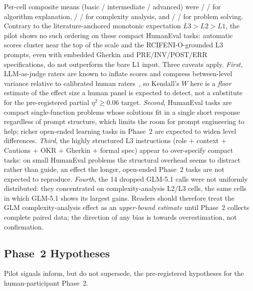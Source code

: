 \documentclass[runningheads]{llncs}
\begin{document}
Per-cell composite means (basic / intermediate / advanced) were \PilotAlgoBasic{} / \PilotAlgoInt{} / \PilotAlgoAdv{} for algorithm explanation, \PilotCxBasic{} / \PilotCxInt{} / \PilotCxAdv{} for complexity analysis, and \PilotPsBasic{} / \PilotPsInt{} / \PilotPsAdv{} for problem solving. Contrary to the literature-anchored monotonic expectation $L3>L2>L1$, the pilot shows no such ordering on these compact HumanEval tasks: automatic scores cluster near the top of the scale and the RCIFENI-O-grounded L3 prompts, even with embedded Gherkin and PRE/INV/POST/ERR specifications, do not outperform the bare L1 input. Three caveats apply. \emph{First}, LLM-as-judge raters are known to inflate scores and compress between-level variance relative to calibrated human raters~\cite{Liu2023}, so Kendall's $W$ here is a \emph{floor} estimate of the effect size a human panel is expected to detect, not a substitute for the pre-registered partial $\eta^2\geq0.06$ target. \emph{Second}, HumanEval tasks are compact single-function problems whose solutions fit in a single short response regardless of prompt structure, which limits the room for prompt engineering to help; richer open-ended learning tasks in Phase~2 are expected to widen level differences. \emph{Third}, the highly structured L3 instructions (role + context + Cautions + OKR + Gherkin + formal spec) appear to over-specify compact tasks: on small HumanEval problems the structural overhead seems to distract rather than guide, an effect the longer, open-ended Phase~2 tasks are not expected to reproduce. \emph{Fourth}, the 14 dropped GLM-5.1 calls were not uniformly distributed: they concentrated on complexity-analysis L2/L3 cells, the same cells in which GLM-5.1 shows its largest gains. Readers should therefore treat the GLM complexity-analysis effect as an \emph{upper-bound estimate} until Phase~2 collects complete paired data; the direction of any bias is towards overestimation, not confirmation.

\subsection{Phase~2 Hypotheses}\label{sec:phase2-hypo}

Pilot signals inform, but do not supersede, the pre-registered hypotheses for the human-participant Phase~2.
\end{document}

